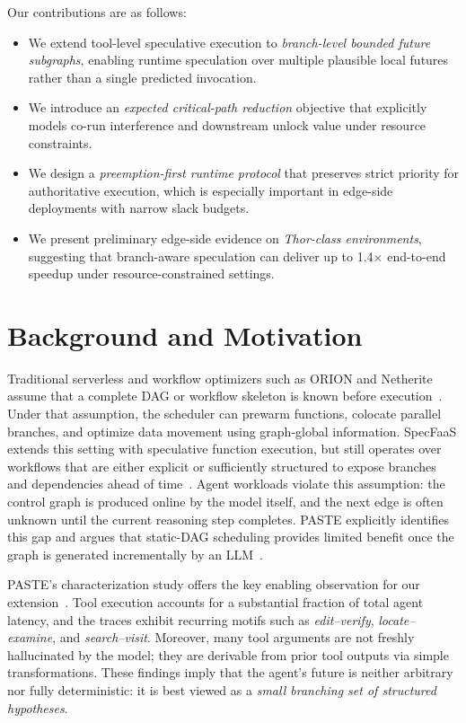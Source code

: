 \documentclass[10pt,twocolumn]{article}
\begin{document}
Our contributions are as follows:
\begin{itemize}[leftmargin=1.5em]
    \item We extend tool-level speculative execution to \emph{branch-level bounded future subgraphs}, enabling runtime speculation over multiple plausible local futures rather than a single predicted invocation.
    \item We introduce an \emph{expected critical-path reduction} objective that explicitly models co-run interference and downstream unlock value under resource constraints.
    \item We design a \emph{preemption-first runtime protocol} that preserves strict priority for authoritative execution, which is especially important in edge-side deployments with narrow slack budgets.
    \item We present preliminary edge-side evidence on \emph{Thor-class environments}, suggesting that branch-aware speculation can deliver up to 1.4$\times$ end-to-end speedup under resource-constrained settings.
\end{itemize}

\section{Background and Motivation}

Traditional serverless and workflow optimizers such as ORION and Netherite assume that a complete DAG or workflow skeleton is known before execution~\cite{orion,netherite}. Under that assumption, the scheduler can prewarm functions, colocate parallel branches, and optimize data movement using graph-global information. SpecFaaS extends this setting with speculative function execution, but still operates over workflows that are either explicit or sufficiently structured to expose branches and dependencies ahead of time~\cite{specfaas}. Agent workloads violate this assumption: the control graph is produced online by the model itself, and the next edge is often unknown until the current reasoning step completes. PASTE explicitly identifies this gap and argues that static-DAG scheduling provides limited benefit once the graph is generated incrementally by an LLM~\cite{paste}.

PASTE's characterization study offers the key enabling observation for our extension~\cite{paste}. Tool execution accounts for a substantial fraction of total agent latency, and the traces exhibit recurring motifs such as \emph{edit--verify}, \emph{locate--examine}, and \emph{search--visit}. Moreover, many tool arguments are not freshly hallucinated by the model; they are derivable from prior tool outputs via simple transformations. These findings imply that the agent's future is neither arbitrary nor fully deterministic: it is best viewed as a \emph{small branching set of structured hypotheses}.
\end{document}
